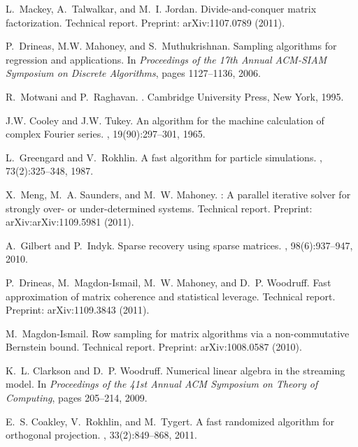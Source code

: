 \documentclass[twoside]{article}
\begin{document}
\begin{small}
\begin{thebibliography}{100}
L.~Mackey, A.~Talwalkar, and M.~I. Jordan.
\newblock Divide-and-conquer matrix factorization.
\newblock Technical report.
\newblock Preprint: arXiv:1107.0789 (2011).

P.~Drineas, M.W. Mahoney, and S.~Muthukrishnan.
\newblock Sampling algorithms for  regression and applications.
\newblock In {\em Proceedings of the 17th Annual ACM-SIAM Symposium on Discrete
  Algorithms}, pages 1127--1136, 2006.

R.~Motwani and P.~Raghavan.
.
\newblock Cambridge University Press, New York, 1995.

J.W. Cooley and J.W. Tukey.
\newblock An algorithm for the machine calculation of complex {F}ourier series.
, 19(90):297--301, 1965.

L.~Greengard and V.~Rokhlin.
\newblock A fast algorithm for particle simulations.
, 73(2):325--348, 1987.

X.~Meng, M.~A. Saunders, and M.~W. Mahoney.
: A parallel iterative solver for strongly over- or
  under-determined systems.
\newblock Technical report.
\newblock Preprint: arXiv:arXiv:1109.5981 (2011).

A.~Gilbert and P.~Indyk.
\newblock Sparse recovery using sparse matrices.
, 98(6):937--947, 2010.

P.~Drineas, M.~Magdon-Ismail, M.~W. Mahoney, and D.~P. Woodruff.
\newblock Fast approximation of matrix coherence and statistical leverage.
\newblock Technical report.
\newblock Preprint: arXiv:1109.3843 (2011).

M.~Magdon-Ismail.
\newblock Row sampling for matrix algorithms via a non-commutative {B}ernstein
  bound.
\newblock Technical report.
\newblock Preprint: arXiv:1008.0587 (2010).

K.~L. Clarkson and D.~P. Woodruff.
\newblock Numerical linear algebra in the streaming model.
\newblock In {\em Proceedings of the 41st Annual ACM Symposium on Theory of
  Computing}, pages 205--214, 2009.

E.~S. Coakley, V.~Rokhlin, and M.~Tygert.
\newblock A fast randomized algorithm for orthogonal projection.
, 33(2):849--868, 2011.


\end{thebibliography}
\end{small}
\end{document}
